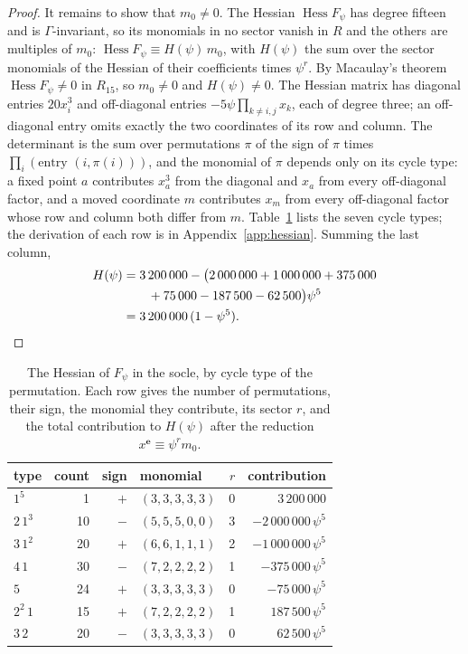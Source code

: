 \documentclass[11pt]{amsart}
\theoremstyle{definition}
\theoremstyle{remark}
\newcommand{\Hess}{\operatorname{Hess}}
\newcommand{\ee}{\mathbf{e}}
\begin{document}
\begin{proof}
It remains to show that $m_0\ne0$. The Hessian $\Hess F_\psi$ has degree
fifteen and is $\Gamma$-invariant, so its monomials in no sector vanish in
$R$ and the others are multiples of $m_0$:
$\Hess F_\psi\equiv H(\psi)\,m_0$, with $H(\psi)$ the sum over the sector
monomials of the Hessian of their coefficients times $\psi^r$. By
Macaulay's theorem $\Hess F_\psi\ne0$ in $R_{15}$, so $m_0\ne0$ and
$H(\psi)\ne0$. The Hessian matrix has diagonal entries $20x_i^3$ and
off-diagonal entries $-5\psi\prod_{k\ne i,j}x_k$, each of degree three; an
off-diagonal entry omits exactly the two coordinates of its row and column.
The determinant is the sum over permutations $\pi$ of the sign of $\pi$
times $\prod_i(\text{entry }(i,\pi(i)))$, and the monomial of $\pi$ depends
only on its cycle type: a fixed point $a$ contributes $x_a^3$ from the
diagonal and $x_a$ from every off-diagonal factor, and a moved coordinate
$m$ contributes $x_m$ from every off-diagonal factor whose row and column
both differ from $m$. Table~\ref{tab:hessian} lists the seven cycle types;
the derivation of each row is in Appendix~\ref{app:hessian}. Summing the
last column,
\begin{align*}
H(\psi)&=3\,200\,000-\big(2\,000\,000+1\,000\,000+375\,000\\
&\qquad+75\,000-187\,500-62\,500\big)\psi^5\\
&=3\,200\,000\,(1-\psi^5). \qedhere
\end{align*}
\end{proof}

\begin{table}[t]
\caption{The Hessian of $F_\psi$ in the socle, by cycle type of the
permutation. Each row gives the number of permutations, their sign, the
monomial they contribute, its sector $r$, and the total contribution to
$H(\psi)$ after the reduction $x^{\ee}\equiv\psi^rm_0$.}
\label{tab:hessian}
\centering
\begin{tabular}{lrrlrr}
\toprule
type & count & sign & monomial & $r$ & contribution\\
\midrule
$1^5$ & 1 & $+$ & $(3,3,3,3,3)$ & 0 & $3\,200\,000$\\
$2\,1^3$ & 10 & $-$ & $(5,5,5,0,0)$ & 3 & $-2\,000\,000\,\psi^5$\\
$3\,1^2$ & 20 & $+$ & $(6,6,1,1,1)$ & 2 & $-1\,000\,000\,\psi^5$\\
$4\,1$ & 30 & $-$ & $(7,2,2,2,2)$ & 1 & $-375\,000\,\psi^5$\\
$5$ & 24 & $+$ & $(3,3,3,3,3)$ & 0 & $-75\,000\,\psi^5$\\
$2^2\,1$ & 15 & $+$ & $(7,2,2,2,2)$ & 1 & $187\,500\,\psi^5$\\
$3\,2$ & 20 & $-$ & $(3,3,3,3,3)$ & 0 & $62\,500\,\psi^5$\\
\bottomrule
\end{tabular}
\end{table}
\end{document}
